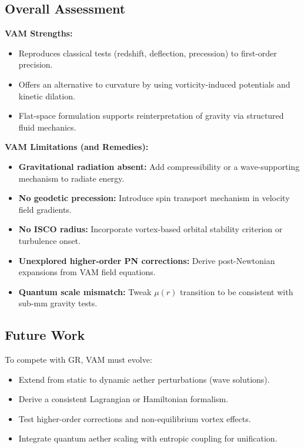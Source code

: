 \vspace{1em}

\subsection*{Overall Assessment}

\textbf{VAM Strengths:}
\begin{itemize}
    \item Reproduces classical tests (redshift, deflection, precession) to first-order precision.
    \item Offers an alternative to curvature by using vorticity-induced potentials and kinetic dilation.
    \item Flat-space formulation supports reinterpretation of gravity via structured fluid mechanics.
\end{itemize}

\textbf{VAM Limitations (and Remedies):}
\begin{itemize}
    \item \textbf{Gravitational radiation absent:} Add compressibility or a wave-supporting mechanism to radiate energy.
    \item \textbf{No geodetic precession:} Introduce spin transport mechanism in velocity field gradients.
    \item \textbf{No ISCO radius:} Incorporate vortex-based orbital stability criterion or turbulence onset.
    \item \textbf{Unexplored higher-order PN corrections:} Derive post-Newtonian expansions from VAM field equations.
    \item \textbf{Quantum scale mismatch:} Tweak $\mu(r)$ transition to be consistent with sub-mm gravity tests.
\end{itemize}

\subsection*{Future Work}

To compete with GR, VAM must evolve:
\begin{itemize}
    \item Extend from static to dynamic aether perturbations (wave solutions).
    \item Derive a consistent Lagrangian or Hamiltonian formalism.
    \item Test higher-order corrections and non-equilibrium vortex effects.
    \item Integrate quantum aether scaling with entropic coupling for unification.
\end{itemize}

